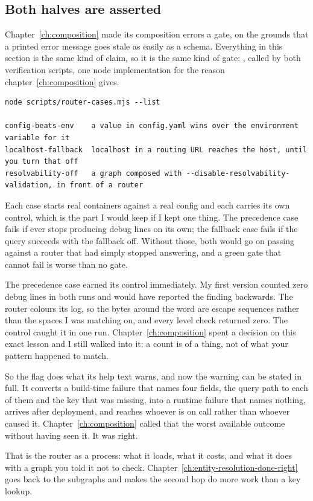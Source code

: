 \subsection*{Both halves are asserted}

%
Chapter~\ref{ch:composition} made its composition errors a gate, on the grounds
that a printed error message goes stale as easily as a schema. Everything in
this section is the same kind of claim, so it is the same kind of gate:
, called by both verification scripts, one node
implementation for the reason chapter~\ref{ch:composition} gives.

\begin{verbatim}
node scripts/router-cases.mjs --list

config-beats-env    a value in config.yaml wins over the environment variable for it
localhost-fallback  localhost in a routing URL reaches the host, until you turn that off
resolvability-off   a graph composed with --disable-resolvability-validation, in front of a router
\end{verbatim}

Each case starts real containers against a real config and each carries its own
control, which is the part I would keep if I kept one thing. The precedence case
fails if  ever stops producing debug lines on its own;
the fallback case fails if the query succeeds with the fallback off. Without
those, both would go on passing against a router that had simply stopped
answering, and a green gate that cannot fail is worse than no gate.

%
The precedence case earned its control immediately. My first version counted
zero debug lines in both runs and would have reported the finding backwards. The
router colours its log, so the bytes around the word are escape sequences rather
than the spaces I was matching on, and every level check returned zero. The
control caught it in one run. Chapter~\ref{ch:composition} spent a decision on
this exact lesson and I still walked into it: a count is of a thing, not of what
your pattern happened to match.

\medskip
So the flag does what its help text warns, and now the warning can be stated in
full. It converts a build-time failure that names four fields, the query path to
each of them and the key that was missing, into a runtime failure that names
nothing, arrives after deployment, and reaches whoever is on call rather than
whoever caused it. Chapter~\ref{ch:composition} called that the worst available
outcome without having seen it. It was right.

That is the router as a process: what it loads, what it costs, and what it does
with a graph you told it not to check.
Chapter~\ref{ch:entity-resolution-done-right} goes back to the subgraphs and
makes the second hop do more work than a key lookup.

%
